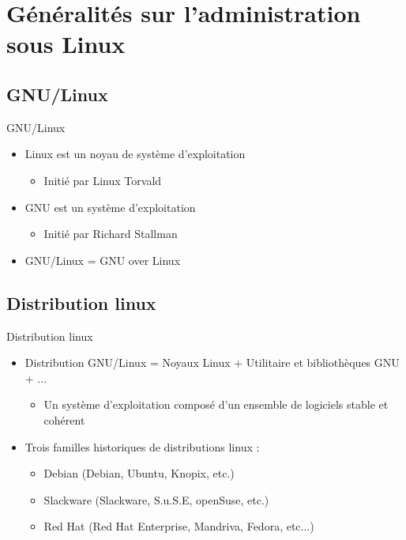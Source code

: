 \section{Généralités sur l'administration sous Linux}

\subsection{GNU/Linux}

\begin{frame}{GNU/Linux}

\begin{itemize}
\item Linux est un noyau de système d'exploitation
    \begin{itemize} \item Initié par Linux Torvald \end{itemize}
\item GNU est un système d'exploitation
    \begin{itemize} \item Initié par Richard Stallman \end{itemize}
\item GNU/Linux = GNU over Linux
\end{itemize}

\end{frame}



\subsection{Distribution linux}
\begin{frame}{Distribution linux}

\begin{itemize}
\item Distribution GNU/Linux = Noyaux Linux + Utilitaire et bibliothèques GNU + ...
\begin{itemize} \item Un système d'exploitation composé d'un ensemble de logiciels stable et cohérent  \end{itemize}
\item Trois familles historiques de distributions linux :
  \begin{itemize}
    \item Debian (Debian, Ubuntu, Knopix, etc.)
    \item Slackware (Slackware, S.u.S.E, openSuse, etc.)
    \item Red Hat (Red Hat Enterprise, Mandriva, Fedora, etc...)
  \end{itemize}
\end{itemize}

\end{frame}

